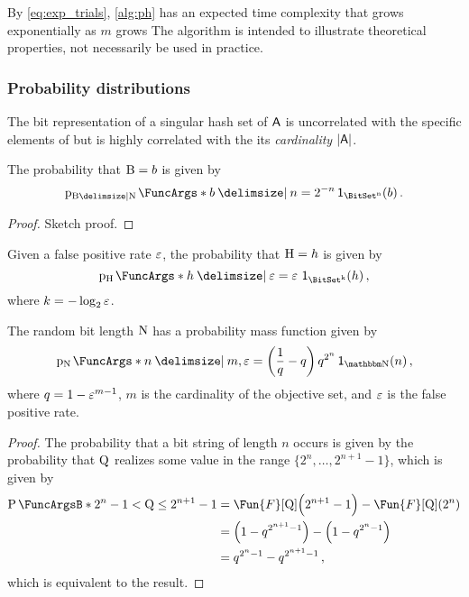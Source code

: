 \documentclass[ ../main.tex]{subfiles}
\begin{document}
By \cref{eq:exp_trials}, \cref{alg:ph} has an expected time complexity that grows exponentially as $m$ grows The algorithm is intended to illustrate theoretical properties, not necessarily be used in practice.

\subsubsection{Probability distributions}
The bit representation of a singular hash set of $\Set{A}$ is uncorrelated with the specific elements of but is highly correlated with the its \emph{cardinality} $\Card{\Set{A}}$.



The probability that $\mathrm{B} = b$ is given by
\begin{equation}
    \PDF{b \Given n}[\RV{B} \Given \RV{N}] = 2^{-n} \SetIndicator{\BitSet^n}(b)\,.
\end{equation}
\begin{proof}
    Sketch proof.
\end{proof}




Given a false positive rate $\varepsilon$, the probability that $\mathrm{H} = h$ is given by
\begin{equation}
    \PDF{h \Given \fprate}[\RV{H}] = \fprate \, \SetIndicator{\BitSet^k}(h)\,,
\end{equation}
where $k = -\log_2 \varepsilon$.



\begin{theorem}
    The random bit length $\mathrm{N}$ has a probability mass function given by
    \begin{equation}
        \label{eq:N_pmf}
        \PDF{n \Given m, \fprate}[\RV{N}] = \left(\frac{1}{q}-q\right) q^{2^n} \SetIndicator{\NatSet}(n)\,,	
    \end{equation}
    where $q = 1 - \varepsilon^{m-1}$, $m$ is the cardinality of the objective set, and $\varepsilon$ is the false positive rate.
\end{theorem}
\begin{proof}
    The probability that a bit string of length $n$ occurs is given by the probability that $\mathrm{Q}$ realizes some value in the range $\{2^n, \ldots, 2^{n+1}-1\}$, which is given by
    \begin{align}
        \Prob{2^n-1 < \RV{Q} \leq 2^{n+1}-1}
        &= \Fun{F}[\RV{Q}]\!\left(2^{n+1}-1\right)-\Fun{F}[\RV{Q}]\!\left(2^n\right)\\
        &= \left(1-q^{2^{n+1}-1}\right) - \left(1-q^{2^n-1}\right)\\		
        &= q^{2^n-1} - q^{2^{n+1}-1}\,,
    \end{align}
    which is equivalent to the result.
\end{proof}
\end{document}
